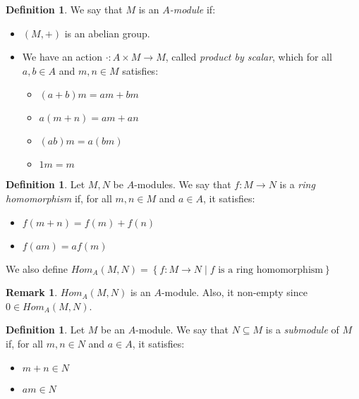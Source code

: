 \documentclass[11pt]{article}
\theoremstyle{definition}
\newtheorem{defn}[theorem]{Definition}
\newtheorem{rk}[theorem]{Remark}
\begin{document}
        \begin{defn}
            We say that $M$ is an \emph{$A$-module} if:
            \begin{itemize}
                \item $(M, +)$ is an abelian group.
                \item We have an action $\cdot: A \times M \longrightarrow M$, called \emph{product by scalar}, which for all $a, b \in A$ and $m, n \in M$ satisfies:
                \begin{itemize}
                    \item $(a + b)m = am + bm$
                    \item $a(m + n) = am + an$
                    \item $(ab)m = a (bm)$
                    \item $1 m = m$
                \end{itemize}
            \end{itemize}
        \end{defn}

        \begin{defn}
            Let $M, N$ be $A$-modules.
            We say that $f: M \longrightarrow N$ is a \emph{ring homomorphism} if, for all $m,n \in M$ and $a \in A$, it satisfies:
            \begin{itemize}
                \item $f(m + n) = f(m) + f(n)$
                \item $f(am) = a f(m)$
            \end{itemize}
            We also define $Hom_A(M,N) = \left\{ f: M \longrightarrow N \mid f \text{ is a ring homomorphism}\right\}$
        \end{defn}

        \begin{rk}
            $Hom_A(M,N)$ is an $A$-module.
            Also, it non-empty since $0 \in Hom_A(M,N)$.
        \end{rk}

        \begin{defn}
            Let $M$ be an $A$-module.
            We say that $N \subseteq M$ is a \emph{submodule} of $M$ if, for all $m, n \in N$ and $a \in A$, it satisfies:
            \begin{itemize}
                \item $m + n \in N$
                \item $am \in N$
            \end{itemize}
        \end{defn}
\end{document}
